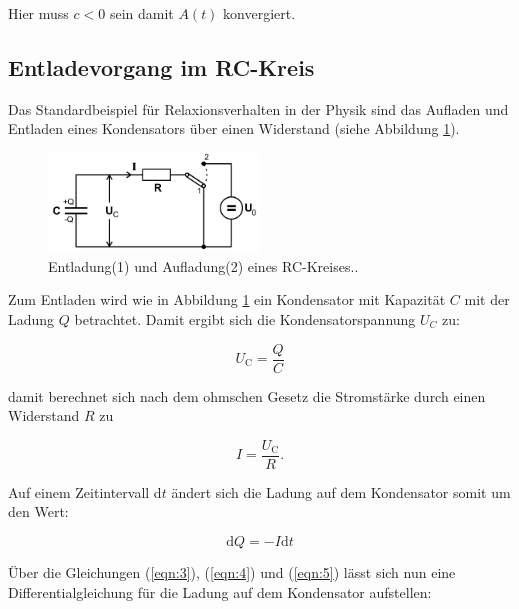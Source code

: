         \noindent Hier muss $c < 0$ sein damit $A(t)$ konvergiert.

    \subsection{Entladevorgang im RC-Kreis}

        \noindent Das Standardbeispiel für Relaxionsverhalten in der Physik sind das Aufladen und Entladen eines Kondensators über einen 
        Widerstand (siehe Abbildung \ref{img:A_und_e}).

        \begin{figure}
            \centering
            \includegraphics[width=0.5\textwidth]{latex/images/Auflade_und_entlade.PNG}
            \caption{Entladung(1) und Aufladung(2) eines RC-Kreises.\protect \cite{V353}.}
            \label{img:A_und_e}
        \end{figure}

        \noindent Zum Entladen wird wie in Abbildung \ref{img:A_und_e} ein Kondensator mit Kapazität $C$ mit der Ladung $Q$ betrachtet.
        Damit ergibt sich die Kondensatorspannung $U_C$ zu:

        \begin{equation}
            U_{\text{C}} = \frac{Q}{C}
            \label{eqn:3}
        \end{equation}

        \noindent damit berechnet sich nach dem ohmschen Gesetz die Stromstärke durch einen Widerstand $R$ zu

        \begin{equation}
            I = \frac{U_{\text{C}}}{R} .
            \label{eqn:4}
        \end{equation}

        \noindent Auf einem Zeitintervall d$t$ ändert sich die Ladung auf dem Kondensator somit um den Wert:

        \begin{equation}
            \text{d}Q = -I \text{d}t
            \label{eqn:5}
        \end{equation}

        \noindent Über die Gleichungen (\ref{eqn:3}), (\ref{eqn:4}) und (\ref{eqn:5}) lässt sich nun eine Differentialgleichung für die 
        Ladung auf dem Kondensator aufstellen:

